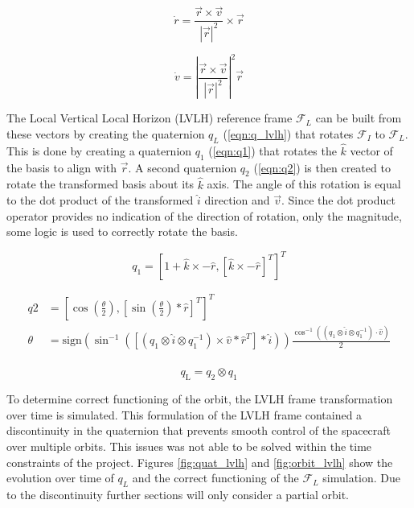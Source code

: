 \documentclass{article}
\begin{document}
\begin{equation}
	\dot{r} = \frac{\vec{r} \times \vec{v}}{|\vec{r}|^2} \times \vec{r}
	\label{eqn:kin_orbit}
\end{equation}

\begin{equation}
	\dot{v} = \left|\frac{\vec{r} \times \vec{v}}{|\vec{r}|^2}\right|^2 \vec{r} 
	\label{eqn:dyn_orbit}
\end{equation}

The Local Vertical Local Horizon (LVLH) reference frame $\mathcal{F}_{L}$ can be built from these vectors by creating the quaternion $q_{L}$ (\ref{eqn:q_lvlh}) that rotates $\mathcal{F}_I$ to $\mathcal{F}_{L}$. This is done by creating a quaternion $q_1$ (\ref{eqn:q1}) that rotates the $\hat{k}$ vector of the basis to align with $\vec{r}$. A second quaternion $q_2$ (\ref{eqn:q2}) is then created to rotate the transformed basis about its $\hat{k}$ axis. The angle of this rotation is equal to the dot product of the transformed $\hat{i}$ direction and $\vec{v}$. Since the dot product operator provides no indication of the direction of rotation, only the magnitude, some logic is used to correctly rotate the basis.

\begin{equation}
	q_1 = [1 + \hat{k} \times -\hat{r}, [\hat{k} \times -\hat{r}]^T]^T
	\label{eqn:q1}
\end{equation} 

\begin{equation}
\begin{aligned}
	q2 &= \left[\cos\left(\frac{\theta}{2}\right), \left[\sin\left(\frac{\theta}{2}\right) * \hat{r}\right]^T\right]^T \\
	\theta &= \textrm{sign}\left(\sin^{-1}\left(\left[\left(q_1 \otimes \hat{i} \otimes q_1^{-1}\right) \times \hat{v} * \hat{r}^T\right] * \hat{i}\right)\right)\frac{\cos^{-1}\left(\left(q_1 \otimes \hat{i} \otimes q_1^{-1}\right) \cdot \hat{v}\right)}{2} \\ \end{aligned}
	\label{eqn:q2}
\end{equation}

\begin{equation}
	q_{\textrm{L}} = q_2 \otimes q_1
	\label{eqn:q_lvlh}
\end{equation}

To determine correct functioning of the orbit, the LVLH frame transformation over time is simulated. This formulation of the LVLH frame contained a discontinuity in the quaternion that prevents smooth control of the spacecraft over multiple orbits. This issues was not able to be solved within the time constraints of the project. Figures \ref{fig:quat_lvlh} and \ref{fig:orbit_lvlh} show the evolution over time of $q_L$ and the correct functioning of the $\mathcal{F}_L$ simulation. Due to the discontinuity further sections will only consider a partial orbit.
\end{document}
